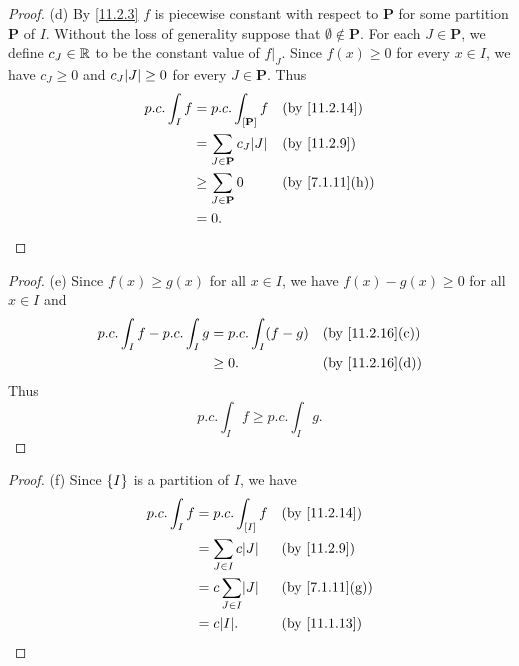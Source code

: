 \begin{proof}{(d)}
  By \cref{11.2.3} \(f\) is piecewise constant with respect to \(\mathbf{P}\) for some partition \(\mathbf{P}\) of \(I\).
  Without the loss of generality suppose that \(\emptyset \notin \mathbf{P}\).
  For each \(J \in \mathbf{P}\), we define \(c_J \in \mathbb{R}\) to be the constant value of \(f|_J\).
  Since \(f(x) \geq 0\) for every \(x \in I\), we have \(c_J \geq 0\) and \(c_J \abs{J} \geq 0\) for every \(J \in \mathbf{P}\).
  Thus
  \begin{align*}
    p.c. \int_I f & = p.c. \int_{[\mathbf{P}]} f          &  & \by{11.2.14}                 \\
                  & = \sum_{J \in \mathbf{P}} c_J \abs{J} &  & \by{11.2.9}                  \\
                  & \geq \sum_{J \in \mathbf{P}} 0        &  & \text{(by \cref{7.1.11}(h))} \\
                  & = 0.
  \end{align*}
\end{proof}

\begin{proof}{(e)}
  Since \(f(x) \geq g(x)\) for all \(x \in I\), we have \(f(x) - g(x) \geq 0\) for all \(x \in I\) and
  \begin{align*}
    p.c. \int_I f - p.c. \int_I g & = p.c. \int_I (f - g) &  & \text{(by \cref{11.2.16}(c))} \\
                                  & \geq 0.               &  & \text{(by \cref{11.2.16}(d))}
  \end{align*}
  Thus
  \[
    p.c. \int_I f \geq p.c. \int_I g.
  \]
\end{proof}

\begin{proof}{(f)}
  Since \(\left\lbrace I\right\rbrace\) is a partition of \(I\), we have
  \begin{align*}
    p.c. \int_I f & = p.c. \int_{[I]} f        &  & \by{11.2.14}                 \\
                  & = \sum_{J \in I} c \abs{J} &  & \by{11.2.9}                  \\
                  & = c \sum_{J \in I} \abs{J} &  & \text{(by \cref{7.1.11}(g))} \\
                  & = c \abs{I}.               &  & \by{11.1.13}
  \end{align*}
\end{proof}

